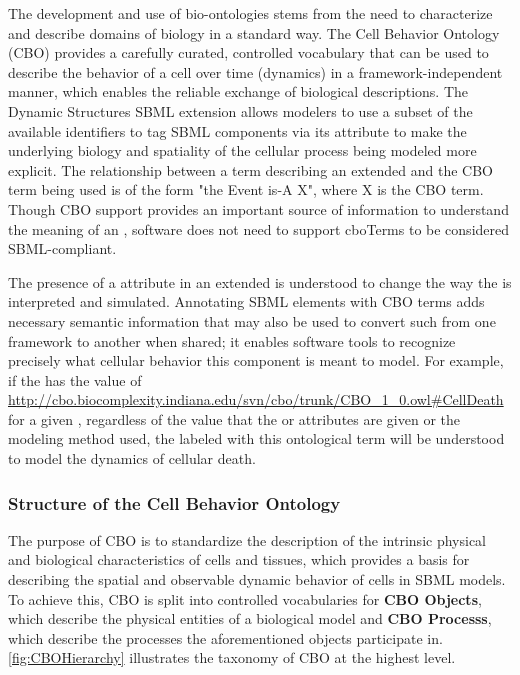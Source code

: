 The development and use of bio-ontologies stems from the need to characterize and describe domains of biology in a standard way. The Cell Behavior Ontology (CBO) provides a carefully curated, controlled vocabulary that can be used to describe the behavior of a cell over time (dynamics) in a framework-independent manner, which enables the reliable exchange of biological descriptions. The Dynamic Structures SBML extension allows modelers to use a subset of the available identifiers to tag SBML \Event components via its attribute  to make the underlying biology and spatiality of the cellular process being modeled more explicit. The relationship between a  term describing an extended \Event and the CBO term being used is of the form "the Event is-A X", where X is the CBO term. Though CBO support provides an important source of information to understand the meaning of an \Event, software does not need to support cboTerms to be considered SBML-compliant.

The presence of a  attribute in an extended \Event is understood to change the way the \Event is interpreted and simulated. Annotating SBML \Event elements with CBO terms adds necessary semantic information that may also be used to convert such \Event from one framework to another when shared; it enables software tools to recognize precisely what cellular behavior this component is meant to model. For example, if the  has the value of \url{http://cbo.biocomplexity.indiana.edu/svn/cbo/trunk/CBO_1_0.owl#CellDeath} for a given \Event, regardless of the value that the  or  attributes are given or the modeling method used, the \Event labeled with this ontological term will be understood to model the dynamics of cellular death.

\subsubsection{Structure of the Cell Behavior Ontology}
\label{subsec:CBOstructure}

The purpose of CBO is to standardize the description of the intrinsic physical and biological characteristics of cells and tissues, which provides a basis for describing the spatial and observable dynamic behavior of cells in SBML models. To achieve this, CBO is split into controlled vocabularies for \textbf{CBO \textunderscore Objects}, which describe the physical entities of a biological model and \textbf{CBO \textunderscore Processs}, which describe the processes the aforementioned objects participate in. \ref{fig:CBOHierarchy} illustrates the taxonomy of CBO at the highest level.


